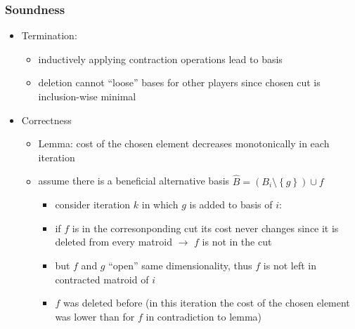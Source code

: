 \documentclass{beamer}
\newcommand{\set}[1]{\left\{#1\right\}}
\begin{document}
\begin{frame}
  \frametitle{Soundness}
  \begin{itemize}
    \item Termination:
      \begin{itemize}
        \item inductively applying contraction operations lead to basis
        \item deletion cannot \enquote{loose} bases for other players since
          chosen cut is inclusion-wise minimal
      \end{itemize}
    \item Correctness
      \begin{itemize}
        \item Lemma: cost of the chosen element decreases monotonically in each
          iteration
        \item assume there is a beneficial alternative basis
          $\hat{B} = (B_{i}\setminus\set{g})\cup{f}$
          \begin{itemize}
            \item consider iteration $k$ in which $g$ is added to basis of $i$:
            \item if $f$ is in the corresonponding cut its cost never changes
              since it is deleted from every matroid $\rightarrow$ $f$ is not
              in the cut
            \item but $f$ and $g$ \enquote{open} same dimensionality, thus $f$
              is not left in contracted matroid of $i$
            \item $f$ was deleted before (in this iteration the cost of the
              chosen element was lower than for $f$ in contradiction to lemma)
          \end{itemize}
      \end{itemize}
  \end{itemize}
\end{frame}
\end{document}
